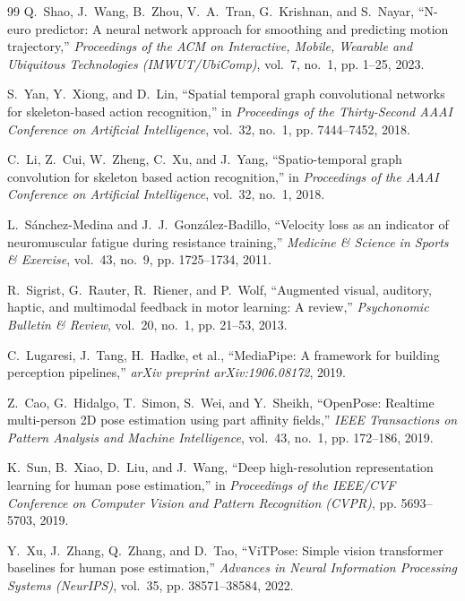 \documentclass[12pt]{report}
\begin{document}
\begin{thebibliography}{99}
Q.~Shao, J.~Wang, B.~Zhou, V.~A.~Tran, G.~Krishnan, and S.~Nayar,
\newblock ``N-euro predictor: A neural network approach for smoothing and predicting motion trajectory,''
\newblock \emph{Proceedings of the ACM on Interactive, Mobile, Wearable and Ubiquitous Technologies (IMWUT/UbiComp)}, vol.~7, no.~1, pp. 1--25, 2023.

S.~Yan, Y.~Xiong, and D.~Lin,
\newblock ``Spatial temporal graph convolutional networks for skeleton-based action recognition,''
\newblock in \emph{Proceedings of the Thirty-Second AAAI Conference on Artificial Intelligence}, vol.~32, no.~1, pp. 7444--7452, 2018.

C.~Li, Z.~Cui, W.~Zheng, C.~Xu, and J.~Yang,
\newblock ``Spatio-temporal graph convolution for skeleton based action recognition,''
\newblock in \emph{Proceedings of the AAAI Conference on Artificial Intelligence}, vol.~32, no.~1, 2018.

L.~S{\'a}nchez-Medina and J.~J.~Gonz{\'a}lez-Badillo,
\newblock ``Velocity loss as an indicator of neuromuscular fatigue during resistance training,''
\newblock \emph{Medicine \& Science in Sports \& Exercise}, vol.~43, no.~9, pp. 1725--1734, 2011.

R.~Sigrist, G.~Rauter, R.~Riener, and P.~Wolf,
\newblock ``Augmented visual, auditory, haptic, and multimodal feedback in motor learning: A review,''
\newblock \emph{Psychonomic Bulletin \& Review}, vol.~20, no.~1, pp. 21--53, 2013.

C.~Lugaresi, J.~Tang, H.~Hadke, et al.,
\newblock ``MediaPipe: A framework for building perception pipelines,''
\newblock \emph{arXiv preprint arXiv:1906.08172}, 2019.

Z.~Cao, G.~Hidalgo, T.~Simon, S.~Wei, and Y.~Sheikh,
\newblock ``OpenPose: Realtime multi-person 2D pose estimation using part affinity fields,''
\newblock \emph{IEEE Transactions on Pattern Analysis and Machine Intelligence}, vol.~43, no.~1, pp. 172--186, 2019.

K.~Sun, B.~Xiao, D.~Liu, and J.~Wang,
\newblock ``Deep high-resolution representation learning for human pose estimation,''
\newblock in \emph{Proceedings of the IEEE/CVF Conference on Computer Vision and Pattern Recognition (CVPR)}, pp. 5693--5703, 2019.

Y.~Xu, J.~Zhang, Q.~Zhang, and D.~Tao,
\newblock ``ViTPose: Simple vision transformer baselines for human pose estimation,''
\newblock \emph{Advances in Neural Information Processing Systems (NeurIPS)}, vol.~35, pp. 38571--38584, 2022.


\end{thebibliography}
\end{document}
